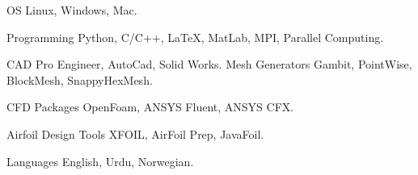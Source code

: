 

\begin{cvskills}
\cvskill
{OS} %
{Linux, Windows, Mac.} %

  \cvskill
    {Programming} %
    {Python, C/C++, LaTeX, MatLab, MPI, Parallel Computing.} %

  \cvskill
    {CAD} %
    {Pro Engineer, AutoCad, Solid Works.} %
\cvskill
{Mesh Generators} %
{Gambit, PointWise, BlockMesh, SnappyHexMesh.} %

\cvskill
{CFD Packages} %
{OpenFoam, ANSYS Fluent, ANSYS CFX.} %

\cvskill
{Airfoil Design Tools} %
{XFOIL, AirFoil Prep, JavaFoil.} %

  \cvskill
    {Languages} %
    {English, Urdu, Norwegian.} %

\end{cvskills}
